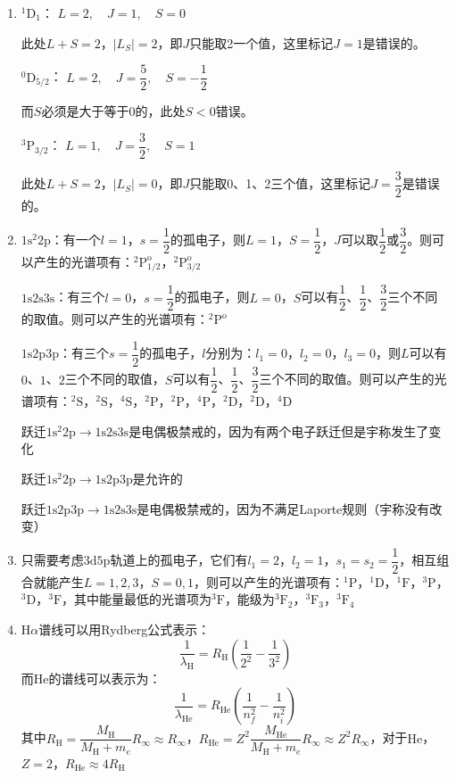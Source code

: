 \documentclass[a4paper]{article}
\begin{document}
\begin{enumerate}
    \bigskip
    \item[3.]
    $^1\mathrm{D}_1$：
    $L=2,\quad J=1,\quad S=0$

    此处$L+S=2$，$|L_S|=2$，即$J$只能取2一个值，这里标记$J=1$是错误的。

    $^0\mathrm{D}_{5/2}$：
    $L=2,\quad J=\dfrac{5}{2},\quad S=-\dfrac{1}{2}$
    
    而$S$必须是大于等于0的，此处$S<0$错误。

    $^3\mathrm{P}_{3/2}$：
    $L=1,\quad J=\dfrac{3}{2},\quad S=1$

    此处$L+S=2$，$|L_S|=0$，即$J$只能取0、1、2三个值，这里标记$J=\dfrac{3}{2}$是错误的。

    \bigskip
    \item[4.]
    $\mathrm{1s^2 2p}$：有一个$l=1$，$s=\dfrac{1}{2}$的孤电子，则$L=1$，$S=\dfrac{1}{2}$，$J$可以取$\dfrac{1}{2}$或$\dfrac{3}{2}$。则可以产生的光谱项有：$\mathrm{^2P^o_{1/2}}$，$\mathrm{^2P^o_{3/2}}$

    $\mathrm{1s 2s 3s}$：有三个$l=0$，$s=\dfrac{1}{2}$的孤电子，则$L=0$，$S$可以有$\dfrac{1}{2}$、$\dfrac{1}{2}$、$\dfrac{3}{2}$三个不同的取值。则可以产生的光谱项有：$\mathrm{^2P^o}$

    $\mathrm{1s 2p 3p}$：有三个$s=\dfrac{1}{2}$的孤电子，$l$分别为：$l_1=0$，$l_2=0$，$l_3=0$，则$L$可以有$0$、$1$、$2$三个不同的取值，$S$可以有$\dfrac{1}{2}$、$\dfrac{1}{2}$、$\dfrac{3}{2}$三个不同的取值。则可以产生的光谱项有：$\mathrm{^2S}$，$\mathrm{^2S}$，$\mathrm{^4S}$，$\mathrm{^2P}$，$\mathrm{^2P}$，$\mathrm{^4P}$，$\mathrm{^2D}$，$\mathrm{^2D}$，$\mathrm{^4D}$

    跃迁$\mathrm{1s^2 2p} \rightarrow \mathrm{1s 2s 3s}$是电偶极禁戒的，因为有两个电子跃迁但是宇称发生了变化

    跃迁$\mathrm{1s^2 2p} \rightarrow \mathrm{1s 2p 3p}$是允许的

    跃迁$\mathrm{1s 2p 3p} \rightarrow \mathrm{1s 2s 3s}$是电偶极禁戒的，因为不满足Laporte规则（宇称没有改变）

    \bigskip
    \item[5.]
    只需要考虑$\mathrm{3d5p}$轨道上的孤电子，它们有$l_1=2$，$l_2=1$，$s_1=s_2=\dfrac{1}{2}$，相互组合就能产生$L=1,2,3$，$S=0,1$，则可以产生的光谱项有：$\mathrm{^1P}$，$\mathrm{^1D}$，$\mathrm{^1F}$，$\mathrm{^3P}$，$\mathrm{^3D}$，$\mathrm{^3F}$，其中能量最低的光谱项为$\mathrm{^3F}$，能级为$\mathrm{^3\mathrm{F}_2}$，$\mathrm{^3\mathrm{F}_3}$，$\mathrm{^3\mathrm{F}_4}$

    \bigskip
    \item[6.]
    $\mathrm{H}\alpha$谱线可以用Rydberg公式表示：
    \[
        \frac{1}{\lambda_{\mathrm{H}}} = R_{\mathrm{H}} \left(\frac{1}{2^2} - \frac{1}{3^2}\right)
    \]
    而$\mathrm{He}$的谱线可以表示为：
    \[
        \frac{1}{\lambda_{\mathrm{He}}} = R_{\mathrm{He}} \left(\frac{1}{n_f^2} - \frac{1}{n_i^2}\right)
    \]
    其中$R_{\mathrm{H}} = \dfrac{M_{\mathrm{H}}}{M_{\mathrm{H}} + m_e} R_\infty \approx R_\infty$，$R_{\mathrm{He}} = Z^2 \dfrac{M_{\mathrm{He}}}{M_{\mathrm{H}} + m_e} R_\infty \approx Z^2 R_\infty$，对于$\mathrm{He}$，$Z=2$，$R_{\mathrm{He}} \approx 4R_{\mathrm{H}}$


\end{enumerate}
\end{document}

